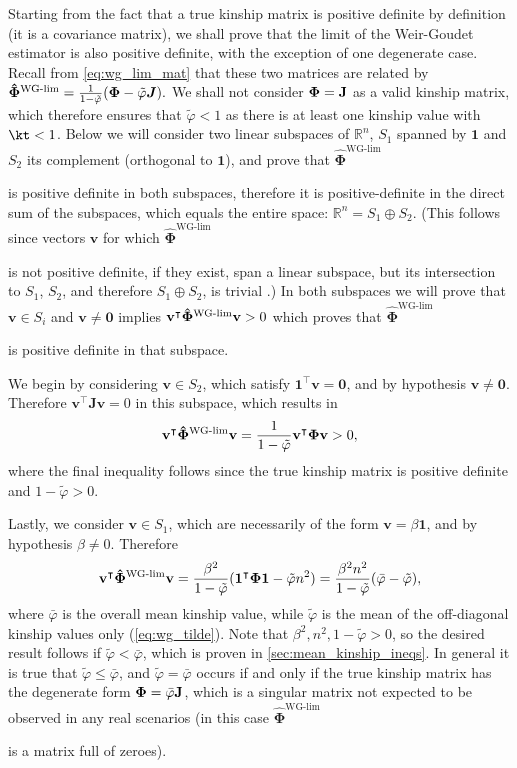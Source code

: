 \documentclass[11pt]{article}
\newcommand{\kinMat}{%
  \ensuremath{%
    \mathbf{\Phi}
  }%
  \xspace%
}%
\newcommand{\kinMatEstNamed}[1]{%
  \ensuremath{%
    \mathbf{\hat{\Phi}}^\text{#1}
  }%
  \xspace%
}%
\newcommand{\kinMatWGLim}{%
  \kinMatEstNamed{WG-lim}
}%
\begin{document}
\begin{appendices}
  Starting from the fact that a true kinship matrix is positive definite by definition (it is a covariance matrix), we shall prove that the limit of the Weir-Goudet estimator is also positive definite, with the exception of one degenerate case.
  Recall from \cref{eq:wg_lim_mat} that these two matrices are related by
  $
  \kinMatWGLim
  =
  \frac{1}{1-\tilde{\varphi}}(\kinMat-\tilde{\varphi}\boldsymbol{J})
  .
  $
  We shall not consider $\kinMat = \mathbf{J}$ as a valid kinship matrix, which therefore ensures that $\tilde{\varphi} < 1$ as there is at least one kinship value with $\kt < 1$.
  Below we will consider two linear subspaces of $\mathbb{R}^n$, $S_1$ spanned by $\mathbf{1}$ and $S_2$ its complement (orthogonal to $\mathbf{1}$), and prove that \kinMatWGLim is positive definite in both subspaces, therefore it is positive-definite in the direct sum of the subspaces, which equals the entire space: $\mathbb{R}^n = S_1 \oplus S_2$.
  (This follows since vectors $\mathbf{v}$ for which \kinMatWGLim is not positive definite, if they exist, span a linear subspace, but its intersection to $S_1$, $S_2$, and therefore $S_1 \oplus S_2$, is trivial \citep{hefferon_linear_2020}.)
  In both subspaces we will prove that $\mathbf{v} \in S_i$ and $\mathbf{v} \ne \mathbf{0}$ implies $\mathbf{v}^\intercal \kinMatWGLim \mathbf{v} > 0$ which proves that \kinMatWGLim is positive definite in that subspace.

  We begin by considering $\mathbf{v} \in S_2$, which satisfy $\mathbf{1}^\intercal \mathbf{v} = \mathbf{0}$, and by hypothesis $\mathbf{v} \ne \mathbf{0}$.
  Therefore $\mathbf{v}^\intercal \mathbf{J} \mathbf{v} = 0$ in this subspace, which results in
  $$
  \mathbf{v}^\intercal \kinMatWGLim \mathbf{v}
  =
  \frac{1}{1-\tilde{\varphi}} \mathbf{v}^\intercal \kinMat \mathbf{v}
  >
  0
  ,
  $$
  where the final inequality follows since the true kinship matrix is positive definite and $1-\tilde{\varphi} > 0$.

  Lastly, we consider $\mathbf{v} \in S_1$, which are necessarily of the form $\mathbf{v} = \beta \mathbf{1}$, and by hypothesis $\beta \ne 0$.
  Therefore
  $$
  \mathbf{v}^\intercal \kinMatWGLim \mathbf{v}
  =
  \frac{ \beta^2 }{1-\tilde{\varphi}}(\boldsymbol{1^\intercal \kinMat 1} - \tilde{\varphi} n^2)
  =
  \frac{ \beta^2 n^2 }{1-\tilde{\varphi}}(\bar{\varphi}-\tilde{\varphi})
  ,
  $$
  where $\bar{\varphi}$ is the overall mean kinship value, while $\tilde{\varphi}$ is the mean of the off-diagonal kinship values only (\cref{eq:wg_tilde}).
  Note that $\beta^2, n^2, 1 - \tilde{\varphi} > 0$, so the desired result follows if $\tilde{\varphi} < \bar{\varphi}$, which is proven in \cref{sec:mean_kinship_ineqs}.
  In general it is true that $\tilde{\varphi} \le \bar{\varphi}$, and $\tilde{\varphi} = \bar{\varphi}$ occurs if and only if the true kinship matrix has the degenerate form $\kinMat = \bar{\varphi} \mathbf{J}$, which is a singular matrix not expected to be observed in any real scenarios (in this case \kinMatWGLim is a matrix full of zeroes).


\end{appendices}
\end{document}
